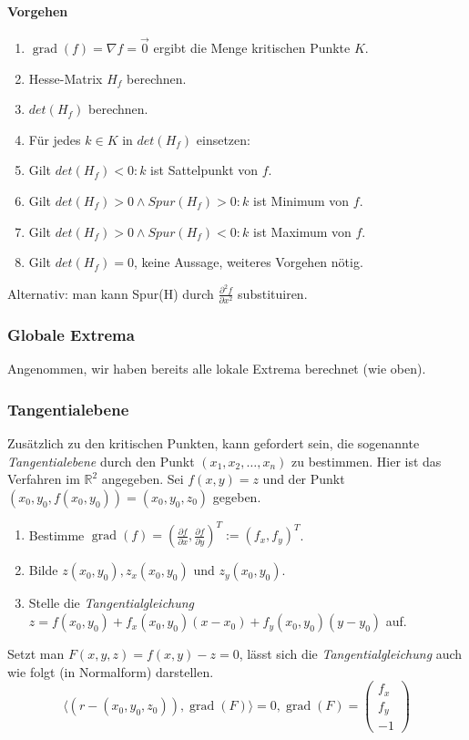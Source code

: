 \documentclass[a4paper, 9pt, DIV=24]{scrartcl}
\DeclareMathOperator{\grad}{grad}
\newcommand{\R}{\mathbb{R}}
\begin{document}
\paragraph{Vorgehen}
\begin{enumerate}[label={(}\arabic*{)}]
 \item $\grad(f) = \nabla f = \vec{0}$ ergibt die Menge kritischen Punkte $K$.
 \item Hesse-Matrix $H_f$ berechnen.
 \item $det(H_f)$ berechnen.
 \item Für jedes $k\in K$ in $det(H_f)$ einsetzen:
 \item Gilt $det(H_f) < 0: k$ ist Sattelpunkt von $f$.
 \item Gilt $det(H_f) > 0 \wedge Spur(H_f) > 0: k$ ist Minimum von $f$.
 \item Gilt $det(H_f) > 0 \wedge Spur(H_f) < 0: k$ ist Maximum von $f$.
 \item Gilt $det(H_f) = 0$, keine Aussage, weiteres Vorgehen nötig.
\end{enumerate}
Alternativ: man kann Spur(H) durch $\frac{\partial^2 f}{\partial x^2}$ substituiren.

\subsubsection{Globale Extrema}
Angenommen, wir haben bereits alle lokale Extrema berechnet (wie oben).

\subsubsection{Tangentialebene}
Zusätzlich zu den kritischen Punkten, kann gefordert sein, die sogenannte \emph{Tangentialebene} durch den Punkt $(x_1, x_2, \dots, x_n)$ zu bestimmen.
Hier ist das Verfahren im $\R^2$ angegeben.
Sei $f(x,y) = z$ und der Punkt $(x_0, y_0, f(x_0, y_0)) = (x_0, y_0, z_0)$ gegeben.
\begin{enumerate}[label={(}\arabic*{)}]
 \item Bestimme $\grad(f) = (\frac{\partial f}{\partial x}, \frac{\partial f}{\partial y})^T := (f_x, f_y)^T$.
 \item Bilde $z(x_0, y_0), z_x(x_0, y_0)$ und $z_y(x_0, y_0)$.
 \item Stelle die \emph{Tangentialgleichung} $z = f(x_0, y_0) + f_x(x_0, y_0)(x - x_0) + f_y(x_0, y_0)(y - y_0)$ auf.
\end{enumerate}
Setzt man $F(x,y,z) = f(x,y) - z = 0$, lässt sich die \emph{Tangentialgleichung} auch wie folgt (in Normalform) darstellen.
\[ \langle (r - (x_0, y_0, z_0)), \grad(F) \rangle = 0, \grad(F) = \begin{pmatrix}f_x \\ f_y \\ -1\end{pmatrix} \]
\end{document}
